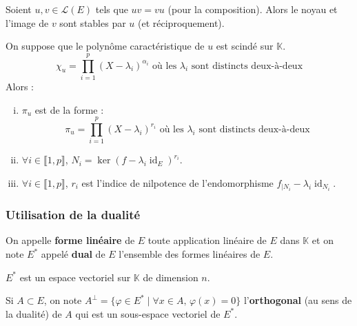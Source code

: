	\begin{proposition}
		Soient $u, v \in \mathcal{L}(E)$ tels que $uv = vu$ (pour la composition). Alors le noyau et l'image de $v$ sont stables par $u$ (et réciproquement).
	\end{proposition}
	
	
	\begin{proposition}
		On suppose que le polynôme caractéristique de $u$ est scindé sur $\mathbb{K}$.
		\[ \chi_u = \prod_{i=1}^p (X - \lambda_i)^{\alpha_i} \text{ où les } \lambda_i \text{ sont distincts deux-à-deux} \]
		Alors :
		\begin{enumerate}[(i)]
			\item $\pi_u$ est de la forme :
			\[ \pi_u = \prod_{i=1}^p (X - \lambda_i)^{r_i} \text{ où les } \lambda_i \text{ sont distincts deux-à-deux} \]
			\item $\forall i \in \llbracket 1, p \rrbracket$, $N_i = \ker{(f - \lambda_i \operatorname{id}_E )^{r_i}}$.
			\item $\forall i \in \llbracket 1, p \rrbracket$, $r_i$ est l'indice de nilpotence de l'endomorphisme $f_{|N_i} - \lambda_i \operatorname{id}_{N_i}$.
		\end{enumerate}
	\end{proposition}
	
	\subsubsection{Utilisation de la dualité}
	
	
	\begin{definition}
		On appelle \textbf{forme linéaire} de $E$ toute application linéaire de $E$ dans $\mathbb{K}$ et on note $E^*$ appelé \textbf{dual} de $E$ l'ensemble des formes linéaires de $E$.
	\end{definition}
	
	\begin{proposition}
		$E^*$ est un espace vectoriel sur $\mathbb{K}$ de dimension $n$.
	\end{proposition}
	
	\begin{definition}
		Si $A \subset E$, on note $A^\perp = \{ \varphi \in E^* \mid \forall x \in A, \, \varphi(x) = 0 \}$ l'\textbf{orthogonal} (au sens de la dualité) de $A$ qui est un sous-espace vectoriel de $E^*$.
	\end{definition}
	
